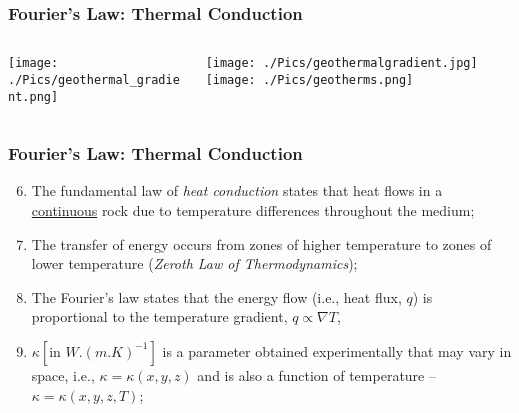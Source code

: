 \documentclass[10pt,compress,unknownkeysallowed]{beamer}
\begin{document}
\begin{frame}
 \frametitle{Fourier's Law: Thermal Conduction}
  \begin{columns}
   \begin{column}[c]{0.5\linewidth}
       \texttt{[image: ./Pics/geothermal\_gradient.png]}
   \end{column}
   \begin{column}[c]{0.5\linewidth}
     \vbox{
        \hbox{\texttt{[image: ./Pics/geothermalgradient.jpg]}}
        \hbox{\texttt{[image: ./Pics/geotherms.png]}}
     }
   \end{column}  
  \end{columns}
\end{frame}


\begin{frame}
 \frametitle{Fourier's Law: Thermal Conduction}
      \begin{enumerate}[1.]\setcounter{enumi}{5}%
        \item <1-> The fundamental law of {\it heat conduction} states that heat flows in a \underline{continuous} rock due to temperature differences throughout the medium;
        \item <2-> The transfer of energy occurs from zones of higher temperature to zones of lower temperature ({\it Zeroth Law of Thermodynamics});
        \item <3-> The Fourier's law states that the energy flow (i.e., heat flux, $q$) is proportional to the temperature gradient, $q\propto \nabla T$,
        \item <4-> $\kappa \left[\text{in }W.\left(m.K\right)^{-1}\right]$ is a parameter obtained experimentally that may vary in space, i.e., $\kappa = \kappa\left(x, y, z\right)$ and is also a function of temperature -- $\kappa = \kappa\left(x, y, z, T\right)$;
      \end{enumerate}
\end{frame}
\end{document}
